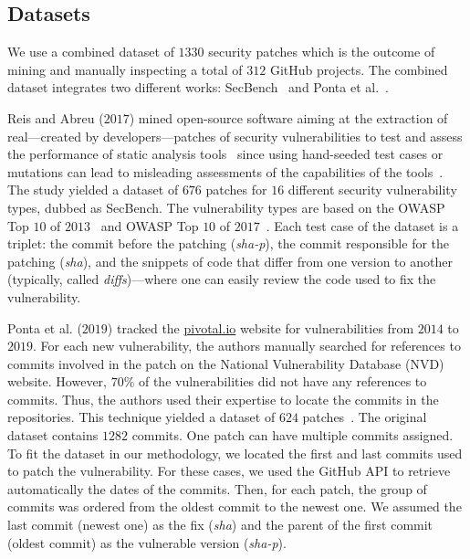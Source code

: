 \documentclass[smallextended]{svjour3}       %
\begin{document}
\subsection{Datasets}
%

We use a combined dataset of $1330$ security patches which is 
the outcome of mining and manually inspecting a total of $312$ 
GitHub projects. The combined dataset integrates two different
works: SecBench~\cite{Reis:2017:IJSSE} and Ponta et al.~\cite{10.1109/MSR.2019.00064}.

Reis and Abreu 
($2017$) mined open-source software aiming at the extraction of 
real---created by developers---patches of security vulnerabilities 
to test and assess the performance of static analysis 
tools~\cite{Reis:2017:IJSSE} since using hand-seeded test cases or 
mutations can lead to misleading assessments of the capabilities of 
the tools~\cite{just2014mutants}. The study yielded a dataset of 
$676$ patches for $16$ different security vulnerability types, dubbed as SecBench. 
The vulnerability types are based on the OWASP Top $10$ of 
$2013$~\cite{oswap:2013} and OWASP Top $10$ of 
$2017$~\cite{oswap:2017}. Each test case of the dataset is a 
triplet: the commit before the patching (\emph{sha-p}), the commit responsible
for the patching (\emph{sha}), and the snippets of code that differ from one 
version to another (typically, called \emph{diffs})---where one 
can easily review the code used to fix the vulnerability. 
%

Ponta et al. ($2019$) tracked the \url{pivotal.io} website for 
vulnerabilities from $2014$ to $2019$. For each new vulnerability, 
the authors manually searched for references to commits involved in 
the patch on the National Vulnerability Database (NVD) website. 
However, $70\%$ of the vulnerabilities did not have any references 
to commits. Thus, the authors used their expertise to locate the 
commits in the repositories. This technique yielded a dataset of 
$624$ patches~\cite{10.1109/MSR.2019.00064}. The original dataset 
contains $1282$ commits. One patch can have multiple commits 
assigned. To fit the dataset in our methodology, we located the 
first and last commits used to patch the vulnerability. For these 
cases, we used the GitHub API to retrieve automatically the dates of 
the commits. Then, for each patch, the group of commits was ordered 
from the oldest commit to the newest one. We assumed the last commit 
(newest one) as the fix (\emph{sha}) and the parent of the 
first commit (oldest commit) as the vulnerable version 
(\emph{sha-p}). 
%
\end{document}
